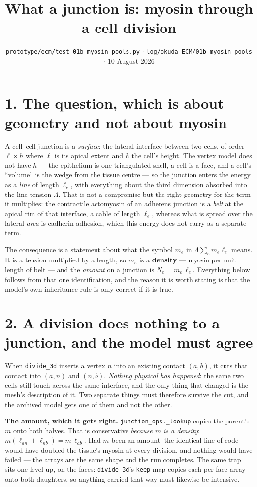 \documentclass[10pt,a4paper]{article}
\title{\vspace{-1.4cm}\textbf{What a junction is: myosin through a cell division}}
\author{}
\date{\vspace{-0.9cm}\small \texttt{prototype/ecm/test\_01b\_myosin\_pools.py} $\cdot$
\texttt{log/okuda\_ECM/01b\_myosin\_pools} $\cdot$ 10 August 2026}
\newcommand{\code}[1]{\texttt{#1}}
\begin{document}
\maketitle\vspace{-1.0cm}

\section*{1.\; The question, which is about geometry and not about myosin}

A cell--cell junction is a \emph{surface}: the lateral interface between two cells, of order
$\ell\times h$ where $\ell$ is its apical extent and $h$ the cell's height. The vertex model does not
have $h$ --- the epithelium is one triangulated shell, a cell is a face, and a cell's ``volume'' is the
wedge from the tissue centre --- so the junction enters the energy as a \emph{line} of length
$\ell_e$, with everything about the third dimension absorbed into the line tension $\Lambda$. That is
not a compromise but the right geometry for the term it multiplies: the contractile actomyosin of an
adherens junction is a \emph{belt} at the apical rim of that interface, a cable of length $\ell_e$,
whereas what is spread over the lateral \emph{area} is cadherin adhesion, which this energy does not
carry as a separate term.

The consequence is a statement about what the symbol $m_e$ in $\Lambda\sum_e m_e\ell_e$ means. It is a
tension multiplied by a length, so $m_e$ is a \textbf{density} --- myosin per unit length of belt ---
and the \emph{amount} on a junction is $N_e = m_e\,\ell_e$. Everything below follows from that one
identification, and the reason it is worth stating is that the model's own inheritance rule is only
correct if it is true.

\section*{2.\; A division does nothing to a junction, and the model must agree}

When \code{divide\_3d} inserts a vertex $n$ into an existing contact $(a,b)$, it cuts that contact into
$(a,n)$ and $(n,b)$. \emph{Nothing physical has happened}: the same two cells still touch across the
same interface, and the only thing that changed is the mesh's description of it. Two separate things
must therefore survive the cut, and the archived model gets one of them and not the other.

\textbf{The amount, which it gets right.} \code{junction\_ops.\_lookup} copies the parent's $m$ onto
both halves. That is conservative \emph{because $m$ is a density}: $m(\ell_{an}+\ell_{nb}) = m\,
\ell_{ab}$. Had $m$ been an amount, the identical line of code would have doubled the tissue's myosin
at every division, and nothing would have failed --- the arrays are the same shape and the run
completes. The same trap sits one level up, on the faces: \code{divide\_3d}'s \code{keep} map copies
each per-face array onto both daughters, so anything carried that way must likewise be intensive.
\end{document}
